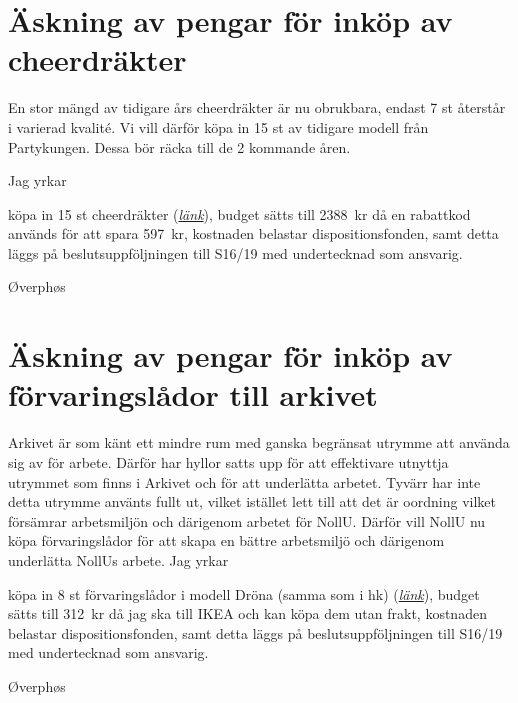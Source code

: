 \documentclass[10pt]{article}
\def\doctype{Handlingar} %
\def\mname{Styrelsemöte} %
\def\mnum{S15/19} %
\begin{document}
    
    \heading{{\doctype} till {\mname} {\mnum}}
    
    \section*{Äskning av pengar för inköp av cheerdräkter}
    
 	En stor mängd av tidigare års cheerdräkter är nu obrukbara, endast 7 st återstår i varierad kvalité. Vi vill därför köpa in 15 st av tidigare modell från Partykungen. Dessa bör räcka till de 2 kommande åren.

   Jag yrkar 

    \begin{attsatser}
        \att köpa in 15 st cheerdräkter (\href{https://www.partykungen.se/hejarklacksledare-svartvit-maskeraddrakt.html}{\textit{länk}}),
        \att budget sätts till \SI{2388}{kr} då en rabattkod används för att spara \SI{597}{kr},
        \att kostnaden belastar dispositionsfonden, samt
        \att detta läggs på beslutsuppföljningen till S16/19 med undertecknad som ansvarig. 
    \end{attsatser}

    \begin{signatures}{1}
    \textit{\ist}
    \signature{Stephanie Bol}{Øverphøs}
    \end{signatures}
    



    \newpage

    \section*{Äskning av pengar för inköp av förvaringslådor till arkivet}
    
 	Arkivet är som känt ett mindre rum med ganska begränsat utrymme att använda sig av för arbete. Därför har hyllor satts upp för att effektivare utnyttja utrymmet som finns i Arkivet och för att underlätta arbetet. Tyvärr har inte detta utrymme använts fullt ut, vilket istället lett till att det är oordning vilket försämrar arbetsmiljön och därigenom arbetet för NollU. Därför  vill NollU nu köpa förvaringslådor för att skapa en bättre arbetsmiljö och därigenom underlätta NollUs arbete. 
   Jag yrkar 

    \begin{attsatser}
        \att köpa in 8 st förvaringslådor i modell Dröna (samma som i hk) (\href{https://www.ikea.com/se/sv/catalog/products/40217955/?_ga=2.179800100.1045764662.1558629624-516555280.1547486300}{\textit{länk}}),
        \att budget sätts till \SI{312}{kr} då jag ska till IKEA och kan köpa dem utan frakt,
        \att kostnaden belastar dispositionsfonden, samt
        \att detta läggs på beslutsuppföljningen till S16/19 med undertecknad som ansvarig. 
    \end{attsatser}

    \begin{signatures}{1}
    \textit{\ist}
    \signature{Stephanie Bol}{Øverphøs}
    \end{signatures}

    
\end{document}
